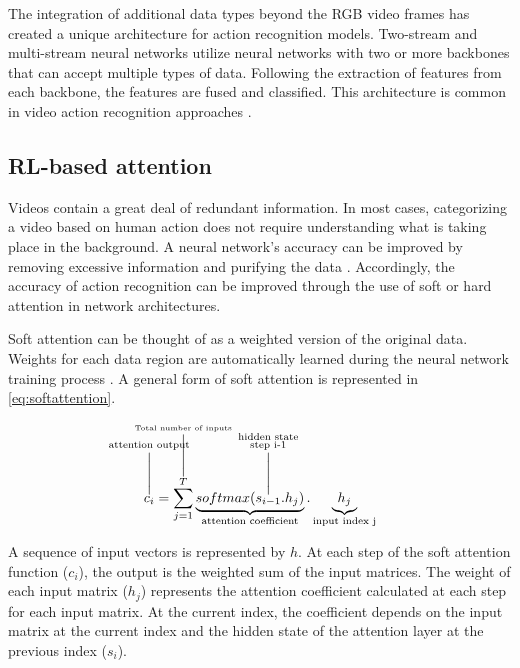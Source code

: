 \documentclass[review]{elsarticle}
\begin{document}
The integration of additional data types beyond the RGB video frames has created a unique architecture for action recognition models. Two-stream and multi-stream neural networks utilize neural networks with two or more backbones that can accept multiple types of data. Following the extraction of features from each backbone, the features are fused and classified. This architecture is common in video action recognition approaches \citep{simonyan2014two, tu2018multi, shi2020skeleton, wang2021multi}.

\subsection{RL-based attention}

Videos contain a great deal of redundant information. In most cases, categorizing a video based on human action does not require understanding what is taking place in the background. A neural network's accuracy can be improved by removing excessive information and purifying the data \citep{song2022learning}. Accordingly, the accuracy of action recognition can be improved through the use of soft or hard attention in network architectures.

Soft attention can be thought of as a weighted version of the original data. Weights for each data region are automatically learned during the neural network training process \citep{sharma2015action, liu2017global, song2017end, li2020spatio}. A general form of soft attention is represented in \autoref{eq:softattention}.

\begin{equation}
\label{eq:softattention}
\overset{\mathclap{\text{attention output}}}{\overset{\Biggl|}{c_{i}}} = \sum_{j=1}^{\overset{\mathclap{\text{Total number of inputs}}}{\overset{\Biggl|}{T}}} \underbrace{softmax(\overset{\mathclap{\substack{\text{hidden state} \\ \text{step i-1}}}}{\overset{\Biggl|}{s_{i-1}}} . h_{j})}_{\text{attention coefficient}} . \underbrace{h_{j}}_{\text{input index j}}
\end{equation}

{A sequence of input vectors is represented by $h$. At each step of the soft attention function ($c_{i}$), the output is the weighted sum of the input matrices. The weight of each input matrix ($h_{j}$) represents the attention coefficient calculated at each step for each input matrix. At the current index, the coefficient depends on the input matrix at the current index and the hidden state of the attention layer at the previous index ($s_{i}$).}
\end{document}
